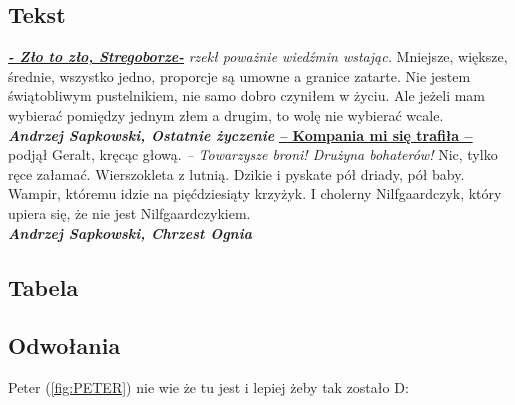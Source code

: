 \subsection{Tekst}
\underline{\textbf{\textit{- Zło to zło, Stregoborze-}}}
\emph{rzekł poważnie wiedźmin wstając.}
Mniejsze, większe, średnie, wszystko jedno,
proporcje są umowne a granice zatarte. 
Nie jestem świątobliwym pustelnikiem, 
nie samo dobro czyniłem w życiu. 
Ale jeżeli mam wybierać pomiędzy jednym złem a drugim, 
to wolę nie wybierać wcale.
\\\textbf{\textit{Andrzej Sapkowski, Ostatnie życzenie}}
\newline
\underline{\textbf{\textit– Kompania mi się trafiła – }}
podjął Geralt, kręcąc głową. 
\emph{– Towarzysze broni! Drużyna bohaterów!}
Nic, tylko ręce załamać. Wierszokleta z lutnią.
Dzikie i pyskate pół driady, pół baby. 
Wampir, któremu idzie na pięćdziesiąty krzyżyk. 
I cholerny Nilfgaardczyk, 
który upiera się, że nie jest Nilfgaardczykiem.
\\\textbf{\textit{Andrzej Sapkowski, Chrzest Ognia}}


\subsection{Tabela}
\label{tab:Piwo}


\subsection{Odwołania}
 Peter (\ref{fig:PETER}) nie wie że tu jest i lepiej żeby tak zostało D: